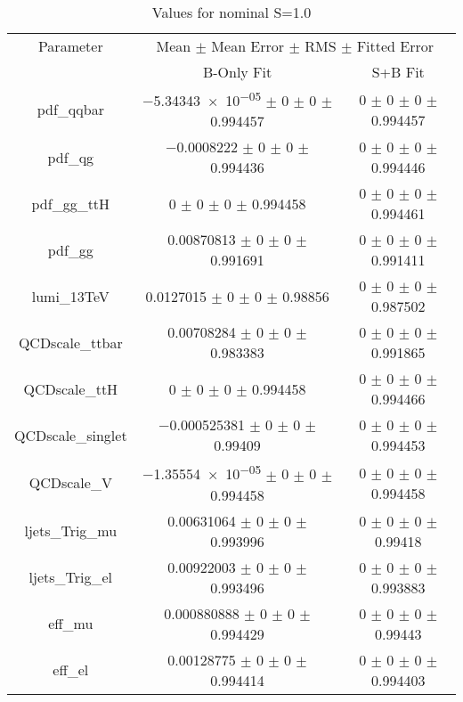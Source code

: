 \begin{table}
\centering
\caption{Values for nominal S=1.0}
\begin{tabular}{ccc}
\toprule
Parameter 	& \multicolumn{2}{c}{Mean $\pm$ Mean Error $\pm$ RMS $\pm$ Fitted Error}\\
 	& B-Only Fit & S+B Fit\\
\midrule
pdf\_qqbar 	& \num{-5.34343e-05} $\pm$ \num{0} $\pm$ \num{0} $\pm$ \num{0.994457} 	& \num{0} $\pm$ \num{0} $\pm$ \num{0} $\pm$ \num{0.994457}\\
pdf\_qg 	& \num{-0.0008222} $\pm$ \num{0} $\pm$ \num{0} $\pm$ \num{0.994436} 	& \num{0} $\pm$ \num{0} $\pm$ \num{0} $\pm$ \num{0.994446}\\
pdf\_gg\_ttH 	& \num{0} $\pm$ \num{0} $\pm$ \num{0} $\pm$ \num{0.994458} 	& \num{0} $\pm$ \num{0} $\pm$ \num{0} $\pm$ \num{0.994461}\\
pdf\_gg 	& \num{0.00870813} $\pm$ \num{0} $\pm$ \num{0} $\pm$ \num{0.991691} 	& \num{0} $\pm$ \num{0} $\pm$ \num{0} $\pm$ \num{0.991411}\\
lumi\_13TeV 	& \num{0.0127015} $\pm$ \num{0} $\pm$ \num{0} $\pm$ \num{0.98856} 	& \num{0} $\pm$ \num{0} $\pm$ \num{0} $\pm$ \num{0.987502}\\
QCDscale\_ttbar 	& \num{0.00708284} $\pm$ \num{0} $\pm$ \num{0} $\pm$ \num{0.983383} 	& \num{0} $\pm$ \num{0} $\pm$ \num{0} $\pm$ \num{0.991865}\\
QCDscale\_ttH 	& \num{0} $\pm$ \num{0} $\pm$ \num{0} $\pm$ \num{0.994458} 	& \num{0} $\pm$ \num{0} $\pm$ \num{0} $\pm$ \num{0.994466}\\
QCDscale\_singlet 	& \num{-0.000525381} $\pm$ \num{0} $\pm$ \num{0} $\pm$ \num{0.99409} 	& \num{0} $\pm$ \num{0} $\pm$ \num{0} $\pm$ \num{0.994453}\\
QCDscale\_V 	& \num{-1.35554e-05} $\pm$ \num{0} $\pm$ \num{0} $\pm$ \num{0.994458} 	& \num{0} $\pm$ \num{0} $\pm$ \num{0} $\pm$ \num{0.994458}\\
ljets\_Trig\_mu 	& \num{0.00631064} $\pm$ \num{0} $\pm$ \num{0} $\pm$ \num{0.993996} 	& \num{0} $\pm$ \num{0} $\pm$ \num{0} $\pm$ \num{0.99418}\\
ljets\_Trig\_el 	& \num{0.00922003} $\pm$ \num{0} $\pm$ \num{0} $\pm$ \num{0.993496} 	& \num{0} $\pm$ \num{0} $\pm$ \num{0} $\pm$ \num{0.993883}\\
eff\_mu 	& \num{0.000880888} $\pm$ \num{0} $\pm$ \num{0} $\pm$ \num{0.994429} 	& \num{0} $\pm$ \num{0} $\pm$ \num{0} $\pm$ \num{0.99443}\\
eff\_el 	& \num{0.00128775} $\pm$ \num{0} $\pm$ \num{0} $\pm$ \num{0.994414} 	& \num{0} $\pm$ \num{0} $\pm$ \num{0} $\pm$ \num{0.994403}\\

\end{tabular}
\end{table}
